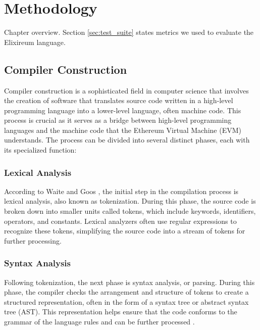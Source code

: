 \chapter{Methodology}
\label{chap:met}

Chapter overview. Section \ref{sec:test_suite} states metrics we used to evaluate the Elixireum language. 


\section{Compiler Construction}
\label{sec:cc}

Compiler construction is a sophisticated field in computer science that involves the creation of software that translates source code written in a high-level programming language into a lower-level language, often machine code. This process is crucial as it serves as a bridge between high-level programming languages and the machine code that the Ethereum Virtual Machine (EVM) understands. The process can be divided into several distinct phases, each with its specialized function:

\subsection{Lexical Analysis}

According to Waite and Goos \cite[135-148]{CompilerConstruction}, the initial step in the compilation process is lexical analysis, also known as tokenization. During this phase, the source code is broken down into smaller units called tokens, which include keywords, identifiers, operators, and constants. Lexical analyzers often use regular expressions to recognize these tokens, simplifying the source code into a stream of tokens for further processing.

\subsection{Syntax Analysis}

Following tokenization, the next phase is syntax analysis, or parsing. During this phase, the compiler checks the arrangement and structure of tokens to create a structured representation, often in the form of a syntax tree or abstract syntax tree (AST). This representation helps ensure that the code conforms to the grammar of the language rules and can be further processed \cite[149-182]{CompilerConstruction}.

